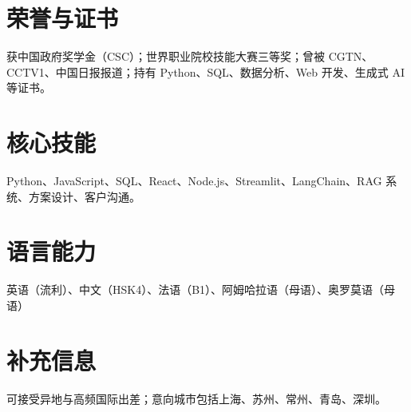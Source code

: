 \documentclass[9pt,a4paper]{article}
\begin{document}
\section*{荣誉与证书}
获中国政府奖学金（CSC）；世界职业院校技能大赛三等奖；曾被 CGTN、CCTV1、中国日报报道；持有 Python、SQL、数据分析、Web 开发、生成式 AI 等证书。

\section*{核心技能}
Python、JavaScript、SQL、React、Node.js、Streamlit、LangChain、RAG 系统、方案设计、客户沟通。

\section*{语言能力}
英语（流利）、中文（HSK4）、法语（B1）、阿姆哈拉语（母语）、奥罗莫语（母语）

\section*{补充信息}
可接受异地与高频国际出差；意向城市包括上海、苏州、常州、青岛、深圳。
\end{document}
